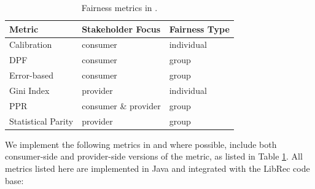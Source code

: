 \begin{table}[tb]
\centering
\caption{Fairness metrics in \libauto.}
\label{tab:fair_metrics}
\begin{threeparttable}
\begin{tabular}{lll}
\toprule
Metric            & Stakeholder Focus     & Fairness Type \\\midrule
Calibration        & consumer             & individual \\
DPF                & consumer             & group \\
Error-based        & consumer             & group \\
Gini Index         & provider             & individual \\
PPR                & consumer \& provider & group \\
Statistical Parity & provider             & group \\
\bottomrule
                                 
\end{tabular}
\end{threeparttable}
\end{table}




We implement the following metrics in \libauto{} and where possible, include both consumer-side and provider-side versions of the metric, as listed in Table \ref{tab:fair_metrics}. All metrics listed here are implemented in Java and integrated with the LibRec code base: 

